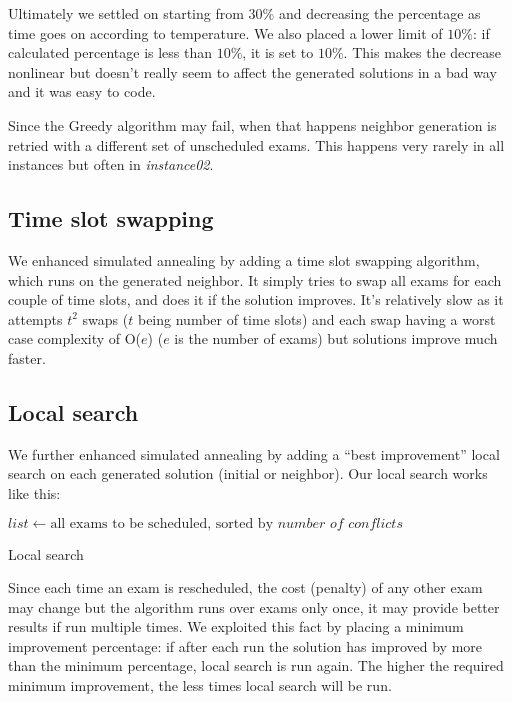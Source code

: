 \documentclass[11pt, a4paper, leqno]{article}
\begin{document}
	Ultimately we settled on starting from $30\%$ and decreasing the percentage as time goes on according to temperature. We also placed a lower limit of $10\%$: if calculated percentage is less than $10\%$, it is set to $10\%$. This makes the decrease nonlinear but doesn't really seem to affect the generated solutions in a bad way and it was easy to code.
	
	Since the Greedy algorithm may fail, when that happens neighbor generation is retried with a different set of unscheduled exams. This happens very rarely in all instances but often in \textit{instance02}.
	
	\subsection{Time slot swapping}
	
	We enhanced simulated annealing by adding a time slot swapping algorithm, which runs on the generated neighbor. It simply tries to swap all exams for each couple of time slots, and does it if the solution improves. It's relatively slow as it attempts $t^2$ swaps ($t$ being number of time slots) and each swap having a worst case complexity of O($e$) ($e$ is the number of exams) but solutions improve much faster.
	
	\subsection{Local search}
	\label{local}
	
	We further enhanced simulated annealing by adding a ``best improvement'' local search on each generated solution (initial or neighbor). Our local search works like this:
	
	\begin{algorithm}[H]
		$list \gets \text{all exams to be scheduled, sorted by }\textit{number of conflicts}$\;
		\caption{Local search}
	\end{algorithm}
	
	Since each time an exam is rescheduled, the cost (penalty) of any other exam may change but the algorithm runs over exams only once, it may provide better results if run multiple times. We exploited this fact by placing a minimum improvement percentage: if after each run the solution has improved by more than the minimum percentage, local search is run again. The higher the required minimum improvement, the less times local search will be run.
	
\end{document}
